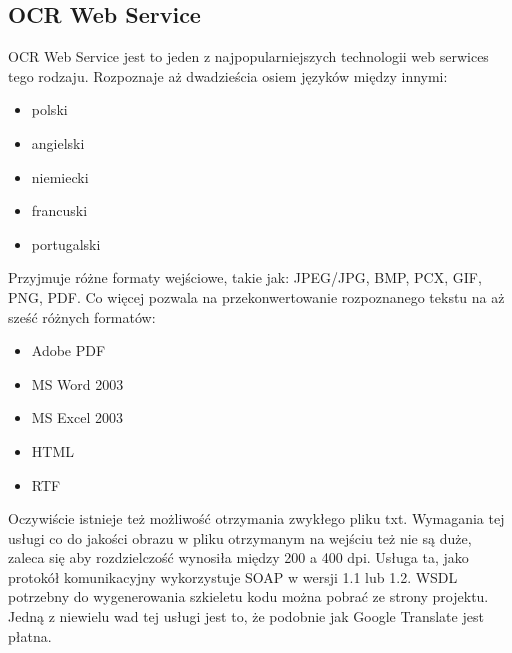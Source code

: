 \subsection{OCR Web Service}
OCR Web Service jest to jeden z najpopularniejszych technologii web serwices tego rodzaju. Rozpoznaje aż dwadzieścia osiem języków między innymi:
\begin{itemize}
	\item polski
	\item angielski
	\item niemiecki
	\item francuski
	\item portugalski
\end{itemize}
Przyjmuje różne formaty wejściowe, takie jak: JPEG/JPG, BMP, PCX, GIF, PNG, PDF. Co więcej pozwala na przekonwertowanie rozpoznanego tekstu na aż sześć różnych formatów:
\begin{itemize}
	\item Adobe PDF
	\item MS Word 2003
	\item MS Excel 2003
	\item HTML
	\item RTF
\end{itemize}
Oczywiście istnieje też możliwość otrzymania zwykłego pliku txt. Wymagania tej usługi co do jakości obrazu w pliku otrzymanym na wejściu też nie są duże, zaleca się aby rozdzielczość wynosiła między 200 a 400 dpi. Usługa ta, jako protokół komunikacyjny wykorzystuje SOAP w wersji 1.1 lub 1.2. WSDL potrzebny do wygenerowania szkieletu kodu można pobrać ze strony projektu. Jedną z niewielu wad tej usługi jest to, że podobnie jak Google Translate jest płatna. 